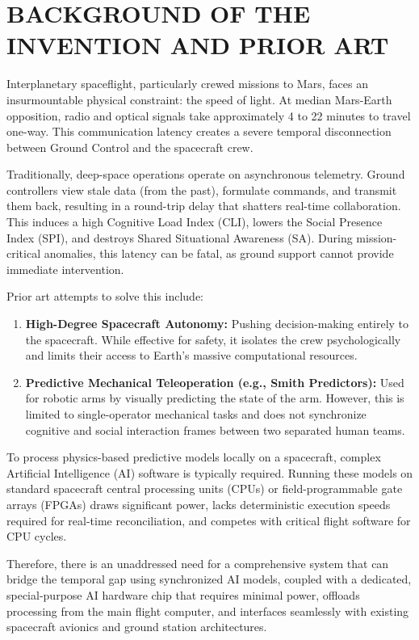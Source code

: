 \documentclass[12pt,a4paper]{article}
\begin{document}
\section*{BACKGROUND OF THE INVENTION AND PRIOR ART}
Interplanetary spaceflight, particularly crewed missions to Mars, faces an insurmountable physical constraint: the speed of light. At median Mars-Earth opposition, radio and optical signals take approximately 4 to 22 minutes to travel one-way. This communication latency creates a severe temporal disconnection between Ground Control and the spacecraft crew.

Traditionally, deep-space operations operate on asynchronous telemetry. Ground controllers view stale data (from the past), formulate commands, and transmit them back, resulting in a round-trip delay that shatters real-time collaboration. This induces a high Cognitive Load Index (CLI), lowers the Social Presence Index (SPI), and destroys Shared Situational Awareness (SA). During mission-critical anomalies, this latency can be fatal, as ground support cannot provide immediate intervention.

Prior art attempts to solve this include:
\begin{enumerate}
    \item \textbf{High-Degree Spacecraft Autonomy:} Pushing decision-making entirely to the spacecraft. While effective for safety, it isolates the crew psychologically and limits their access to Earth's massive computational resources.
    \item \textbf{Predictive Mechanical Teleoperation (e.g., Smith Predictors):} Used for robotic arms by visually predicting the state of the arm. However, this is limited to single-operator mechanical tasks and does not synchronize cognitive and social interaction frames between two separated human teams.
\end{enumerate}

To process physics-based predictive models locally on a spacecraft, complex Artificial Intelligence (AI) software is typically required. Running these models on standard spacecraft central processing units (CPUs) or field-programmable gate arrays (FPGAs) draws significant power, lacks deterministic execution speeds required for real-time reconciliation, and competes with critical flight software for CPU cycles. 

Therefore, there is an unaddressed need for a comprehensive system that can bridge the temporal gap using synchronized AI models, coupled with a dedicated, special-purpose AI hardware chip that requires minimal power, offloads processing from the main flight computer, and interfaces seamlessly with existing spacecraft avionics and ground station architectures.
\end{document}
